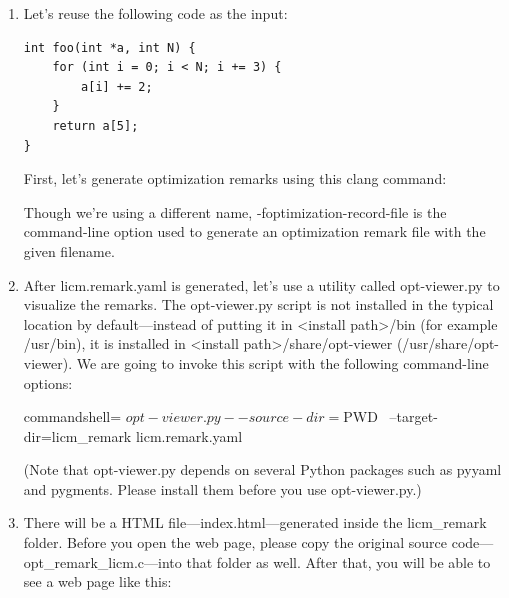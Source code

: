 \begin{enumerate}
\item Let's reuse the following code as the input:

\begin{lstlisting}[style=styleCXX]
int foo(int *a, int N) {
	for (int i = 0; i < N; i += 3) {
		a[i] += 2;
	}
	return a[5];
}
\end{lstlisting}

First, let's generate optimization remarks using this clang command:


Though we're using a different name, -foptimization-record-file is the command-line option used to generate an optimization remark file with the given filename.

\item After licm.remark.yaml is generated, let's use a utility called opt-viewer.py to visualize the remarks. The opt-viewer.py script is not installed in the typical location by default—instead of putting it in <install path>/bin (for example /usr/bin), it is installed in <install path>/share/opt-viewer (/usr/share/opt-viewer). We are going to invoke this script with the following command-line options:

\begin{tcblisting}{commandshell={}}
$ opt-viewer.py --source-dir=$PWD \
--target-dir=licm_remark licm.remark.yaml
\end{tcblisting}

(Note that opt-viewer.py depends on several Python packages such as pyyaml and pygments. Please install them before you use opt-viewer.py.)

\item There will be a HTML file—index.html—generated inside the licm\_remark folder. Before you open the web page, please copy the original source code—opt\_remark\_licm.c—into that folder as well. After that, you will be able to see a web page like this:


\end{enumerate}
